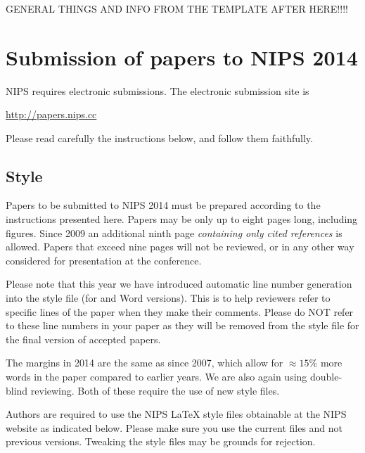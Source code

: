 \documentclass{article} %
\begin{document}
\noindent\makebox[\linewidth]{\rule{\paperwidth}{2pt}} \\%
\noindent\makebox[\linewidth]{\rule{\paperwidth}{2pt}} \\%
\noindent\makebox[\linewidth]{\rule{\paperwidth}{2pt}} \\%

GENERAL THINGS AND INFO FROM THE TEMPLATE AFTER HERE!!!! \\


\section{Submission of papers to NIPS 2014}

NIPS requires electronic submissions.  The electronic submission site is  
\begin{center}
   \url{http://papers.nips.cc}
\end{center}

Please read carefully the
instructions below, and follow them faithfully.
\subsection{Style}

Papers to be submitted to NIPS 2014 must be prepared according to the
instructions presented here. Papers may be only up to eight pages long,
including figures. Since 2009 an additional ninth page \textit{containing only
cited references} is allowed. Papers that exceed nine pages will not be
reviewed, or in any other way considered for presentation at the conference.

Please note that this year we have introduced automatic line number generation
into the style file (for \LaTeXe and Word versions). This is to help reviewers
refer to specific lines of the paper when they make their comments. Please do
NOT refer to these line numbers in your paper as they will be removed from the
style file for the final version of accepted papers.

The margins in 2014 are the same as since 2007, which allow for $\approx 15\%$
more words in the paper compared to earlier years. We are also again using 
double-blind reviewing. Both of these require the use of new style files.

Authors are required to use the NIPS \LaTeX{} style files obtainable at the
NIPS website as indicated below. Please make sure you use the current files and
not previous versions. Tweaking the style files may be grounds for rejection.
\end{document}
